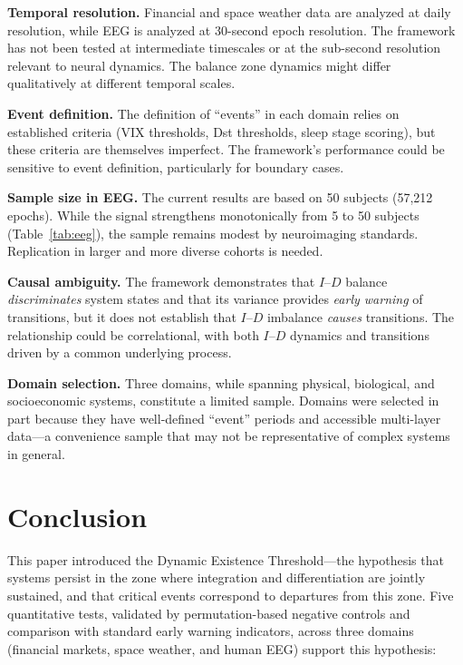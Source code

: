 \documentclass[aip,cha,reprint,amsmath,amssymb]{revtex4-2}
\begin{document}
\textbf{Temporal resolution.} Financial and space weather data are analyzed at daily resolution, while EEG is analyzed at 30-second epoch resolution. The framework has not been tested at intermediate timescales or at the sub-second resolution relevant to neural dynamics. The balance zone dynamics might differ qualitatively at different temporal scales.

\textbf{Event definition.} The definition of ``events'' in each domain relies on established criteria (VIX thresholds, Dst thresholds, sleep stage scoring), but these criteria are themselves imperfect. The framework's performance could be sensitive to event definition, particularly for boundary cases.

\textbf{Sample size in EEG.} The current results are based on 50 subjects (57,212 epochs). While the signal strengthens monotonically from 5 to 50 subjects (Table~\ref{tab:eeg}), the sample remains modest by neuroimaging standards. Replication in larger and more diverse cohorts is needed.

\textbf{Causal ambiguity.} The framework demonstrates that $I$--$D$ balance \emph{discriminates} system states and that its variance provides \emph{early warning} of transitions, but it does not establish that $I$--$D$ imbalance \emph{causes} transitions. The relationship could be correlational, with both $I$--$D$ dynamics and transitions driven by a common underlying process.

\textbf{Domain selection.} Three domains, while spanning physical, biological, and socioeconomic systems, constitute a limited sample. Domains were selected in part because they have well-defined ``event'' periods and accessible multi-layer data---a convenience sample that may not be representative of complex systems in general.


\section{Conclusion}

This paper introduced the Dynamic Existence Threshold---the hypothesis that systems persist in the zone where integration and differentiation are jointly sustained, and that critical events correspond to departures from this zone. Five quantitative tests, validated by permutation-based negative controls and comparison with standard early warning indicators, across three domains (financial markets, space weather, and human EEG) support this hypothesis:
\end{document}

